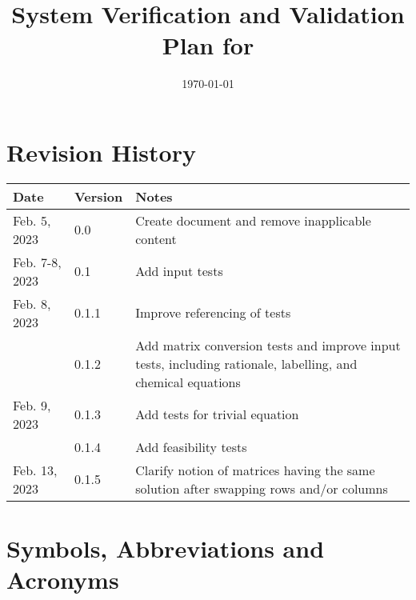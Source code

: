 \documentclass[12pt, titlepage]{article}
\begin{document}
\title{%
  System Verification and Validation Plan for \progname{}}
\author{\authname}
\date{\today}

\maketitle


\section{Revision History}

\begin{tabularx}{\textwidth}{llX}
  \toprule {\bf Date} & {\bf Version} & {\bf Notes}                       \\
  \midrule
  Feb. 5, 2023        & 0.0           & Create document and remove
  inapplicable content                                                    \\
  Feb. 7-8, 2023      & 0.1           & Add input tests                   \\
  Feb. 8, 2023        & 0.1.1         & Improve referencing of tests      \\
                      & 0.1.2         & Add matrix conversion tests and
  improve input tests, including rationale, labelling, and chemical
  equations                                                               \\
  Feb. 9, 2023        & 0.1.3         & Add tests for trivial equation    \\
                      & 0.1.4         & Add feasibility tests             \\
  Feb. 13, 2023       & 0.1.5         & Clarify notion of matrices having
  the same solution after swapping rows and/or columns                    \\
  \bottomrule
\end{tabularx}

\newpage

\tableofcontents

\listoftables
{}

\listoffigures
{}

\newpage

\section{Symbols, Abbreviations and Acronyms}
\end{document}
